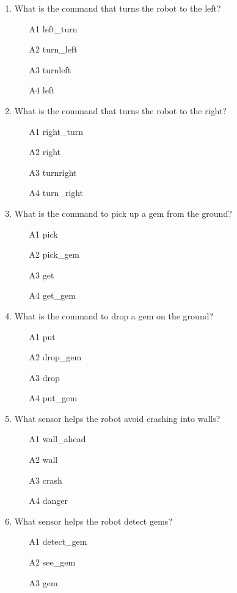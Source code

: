 \begin{enumerate}
\begin{enumerate}
\end{enumerate}
\item What is the command that turns the robot to the left?
\begin{enumerate}
\item[A1] left\_turn
\item[A2] turn\_left
\item[A3] turnleft
\item[A4] left
\end{enumerate}
\item What is the command that turns the robot to the right?
\begin{enumerate}
\item[A1] right\_turn
\item[A2] right
\item[A3] turnright
\item[A4] turn\_right
\end{enumerate}
\item What is the command to pick up a gem from the ground?
\begin{enumerate}
\item[A1] pick
\item[A2] pick\_gem
\item[A3] get
\item[A4] get\_gem
\end{enumerate}
\item What is the command to drop a gem on the ground?
\begin{enumerate}
\item[A1] put
\item[A2] drop\_gem
\item[A3] drop 
\item[A4] put\_gem
\end{enumerate}
\item What sensor helps the robot avoid crashing into walls?
\begin{enumerate}
\item[A1] wall\_ahead
\item[A2] wall
\item[A3] crash
\item[A4] danger
\end{enumerate}
\item What sensor helps the robot detect gems?
\begin{enumerate}
\item[A1] detect\_gem
\item[A2] see\_gem
\item[A3] gem

\end{enumerate}
\end{enumerate}
